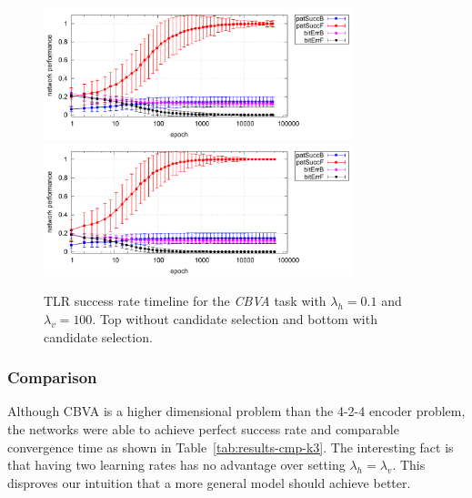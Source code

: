 \begin{figure}[H]
  \centering
  \includegraphics[width=0.8\textwidth]{img/tlr-k3-3-best-perf.pdf}   
  \includegraphics[width=0.8\textwidth]{img/tlr-k3-3-best-can.pdf}      
  \caption{TLR success rate timeline for the \emph{CBVA} task with $\lambda_h=0.1$ and $\lambda_v=100$. Top without candidate selection and bottom with candidate selection. }
  \label{fig:results-tlr-k3-epoch} 
\end{figure}

\subsubsection{Comparison} 
\label{sec:results-cmp-k3} 
Although CBVA is a higher dimensional problem than the 4-2-4 encoder problem, the networks were able to achieve perfect success rate and comparable convergence time as shown in Table~\ref{tab:results-cmp-k3}. The interesting fact is that having two learning rates has no advantage over setting $\lambda_h = \lambda_v$. This disproves our intuition that a more general model should achieve better. 


